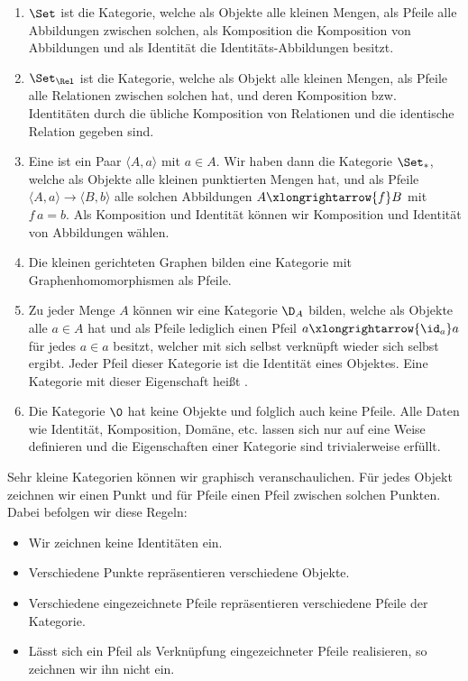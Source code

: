 \begin{bsp}
\begin{enumerate}
\item $\Set$ ist die Kategorie, welche als Objekte alle kleinen Mengen, als Pfeile alle Abbildungen zwischen solchen, als Komposition die Komposition von Abbildungen und als Identität die Identitäts-Abbildungen besitzt.
\item $\Set_\Rel$ ist die Kategorie, welche als Objekt alle kleinen Mengen, als Pfeile alle Relationen zwischen solchen hat, und deren Komposition bzw. Identitäten durch die übliche Komposition von Relationen und die identische Relation gegeben sind.
\item Eine  ist ein Paar $\langle A,a\rangle$ mit $a\in A$. Wir haben dann die Kategorie $\Set_\ast$, welche als Objekte alle kleinen punktierten Mengen hat, und als Pfeile $\langle A,a\rangle\longrightarrow\langle B,b\rangle$ alle solchen Abbildungen $A\xlongrightarrow{f}B$ mit $f\, a=b$. Als Komposition und Identität können wir Komposition und Identität von Abbildungen wählen.
\item Die kleinen gerichteten Graphen bilden eine Kategorie  mit Graphenhomomorphismen als Pfeile.
\item Zu jeder Menge $A$ können wir eine Kategorie $\D_A$ bilden, welche als Objekte alle $a\in A$ hat und als Pfeile lediglich einen Pfeil $a\xlongrightarrow{\id_a}a$ für jedes $a\in a$ besitzt, welcher mit sich selbst verknüpft wieder sich selbst ergibt. Jeder Pfeil dieser Kategorie ist die Identität eines Objektes. Eine Kategorie mit dieser Eigenschaft heißt .
\item Die Kategorie $\0$ hat keine Objekte und folglich auch keine Pfeile. Alle Daten wie Identität, Komposition, Domäne, etc. lassen sich nur auf eine Weise definieren und die Eigenschaften einer Kategorie sind trivialerweise erfüllt.
\end{enumerate}
\end{bsp}

Sehr kleine Kategorien können wir graphisch veranschaulichen. Für jedes Objekt zeichnen wir einen Punkt und für Pfeile einen Pfeil zwischen solchen Punkten. Dabei befolgen wir diese Regeln:
\begin{itemize}
\item Wir zeichnen keine Identitäten ein.
\item Verschiedene Punkte repräsentieren verschiedene Objekte.
\item Verschiedene eingezeichnete Pfeile repräsentieren verschiedene Pfeile der Kategorie.
\item Lässt sich ein Pfeil als Verknüpfung eingezeichneter Pfeile realisieren, so zeichnen wir ihn nicht ein.
\end{itemize}

